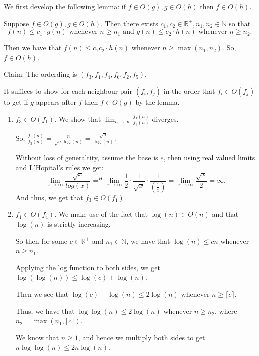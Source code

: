 \begin{soln}
	We first develop the following lemma: if \(f \in O(g), g \in O(h)\) then \(f \in O(h)\).

	Suppose \(f \in O(g), g \in O(h)\). Then there exists \(c_1, c_2 \in \mathbb{R}^{+}, n_1, n_2 \in \mathbb{N}\)
	so that
	\[
		f(n) \leq c_1 \cdot g(n) \text{ whenever } n \geq n_1 \text{ and } g(n) \leq c_2 \cdot h(n) \text{ whenever } n \geq n_2.
	\]

	Then we have that \(f(n) \leq c_1 c_2 \cdot h(n)\) whenever \(n \geq \max(n_1, n_2)\). So, \(f \in O(h)\).

	Claim: The orderding is \((f_3, f_1, f_4, f_6, f_2, f_5)\).

	It suffices to show for each neighbour pair \((f_i, f_j)\) in the order that \(f_i \in O(f_j)\) to get if \(g\) appears after \(f\) then \(f \in O(g)\) by the lemma.


	\begin{enumerate}
		\item \(f_3 \in O(f_1)\). We show that \(\lim_{n \to \infty} \frac{f_1(n)}{f_3(n)}\) diverges.

		      So, \(\frac{f_1(n)}{f_3(n)} = \frac{n}{\sqrt{n} \log(n)} = \frac{\sqrt{n}}{\log(n)}\).

		      Without loss of generaltity, assume the base is \(e\), then using real valued limits and L'Hopital's rules we get:
		      \[
			      \lim_{x \to \infty} \frac{\sqrt{x}}{log(x)}  =^{H} \lim_{x \to \infty} \frac{1}{2} \cdot \frac{1}{\sqrt{x}} \cdot \frac{1}{\left(\frac{1}{x}\right)} = \lim_{x \to \infty} \frac{\sqrt{x}}{2} = \infty.
		      \]
		      And thus, we get that \(f_3 \in O(f_1)\).

		\item \(f_1 \in O(f_4)\). We make use of the fact that \(\log(n) \in O(n)\) and that \(\log(n)\) is strictly increasing.

		      So then for some \(c \in \mathbb{R}^{+}\) and \(n_1 \in \mathbb{N}\), we have that \(\log(n) \leq cn\) whenever \(n \geq n_1\).

		      Applying the log function to both sides, we get \(\log(\log(n)) \leq \log(c) + \log(n)\).

		      Then we see that \(\log(c) + \log(n) \leq 2\log(n)\) whenever \(n \geq \lceil c \rceil\).

		      Thus, we have that \(\log\log(n) \leq 2\log(n)\) whenever \(n \geq n_2\), where \(n_2 = \max(n_1, \lceil c \rceil)\).

		      We know that \(n \geq 1\), and hence we multiply both sides to get \(n \log\log(n) \leq 2n\log(n)\).


\end{enumerate}
\end{soln}
